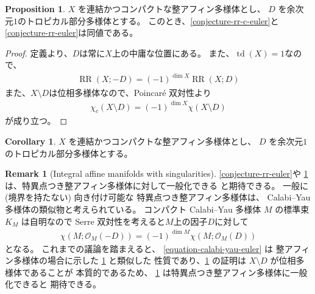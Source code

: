 \documentclass[a4paper,dvipdfmx,reqno,12pt]{amsart}
\theoremstyle{definition}
\newtheorem{proposition}[theorem]{Proposition}
\newtheorem{corollary}[theorem]{Corollary}
\newtheorem{remark}[theorem]{Remark}
\newcommand{\opn}[1]{\operatorname{#1}}
\numberwithin{equation}{section}
\begin{document}
\begin{proposition}
\label{proposition-divisor-poincare}
$X$ を連結かつコンパクトな整アフィン多様体とし、
$D$ を余次元$1$のトロピカル部分多様体とする。
このとき、\cref{conjecture-rr-c-euler}と
\cref{conjecture-rr-euler}は同値である。
\end{proposition}
\begin{proof}
定義より、$D$は常に$X$上の中庸な位置にある。
また、$\opn{td}(X)=1$なので、
\begin{align}
\opn{RR}(X;-D)=(-1)^{\dim X}\opn{RR}(X;D)
\end{align}
また、$X\setminus D$は位相多様体なので、Poincar\'e 双対性より
\begin{align}
\chi_c(X\setminus D)=(-1)^{\dim X}\chi(X\setminus D)
\end{align}
が成り立つ。
\end{proof}

\begin{corollary}
$X$ を連結かつコンパクトな整アフィン多様体とし、
$D$ を余次元$1$のトロピカル部分多様体とする。	
\end{corollary}

\begin{remark}[{Integral affine manifolds with singularities}]
\label{remark-iass}
\cref{conjecture-rr-euler}や
\cref{proposition-divisor-poincare}
は、特異点つき整アフィン多様体に対して一般化できる
と期待できる。
一般に (境界を持たない) 向き付け可能な
特異点つき整アフィン多様体は、
Calabi--Yau 多様体の類似物と考えられている。
コンパクト Calabi--Yau 多様体 $M$ の標準束
$K_M$ は自明なので
Serre 双対性を考えると$M$上の因子$D$に対して
\begin{align}
\label{equation-calabi-yau-euler}
\chi(M;\mathcal{O}_M(-D))=(-1)^{\dim M}
\chi(M;\mathcal{O}_{M}(D))
\end{align}
となる。
これまでの議論を踏まえると、
\cref{equation-calabi-yau-euler} は
整アフィン多様体の場合に示した
\cref{proposition-divisor-poincare} と類似した
性質であり、\cref{proposition-divisor-poincare}
の証明は $X\setminus D$ が位相多様体であることが
本質的であるため、
\cref{proposition-divisor-poincare}
は特異点つき整アフィン多様体に一般化できると
期待できる。
\end{remark}
\end{document}
